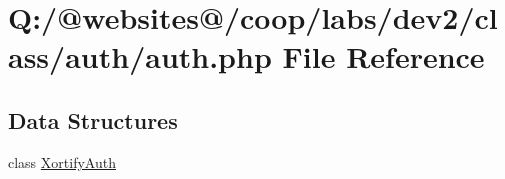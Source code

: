 \hypertarget{auth_8php}{\section{Q\-:/@websites@/coop/labs/dev2/class/auth/auth.php File Reference}
\label{auth_8php}
}
\subsection*{Data Structures}
\begin{DoxyCompactItemize}
\item 
class \hyperlink{class_xortify_auth}{Xortify\-Auth}
\end{DoxyCompactItemize}
